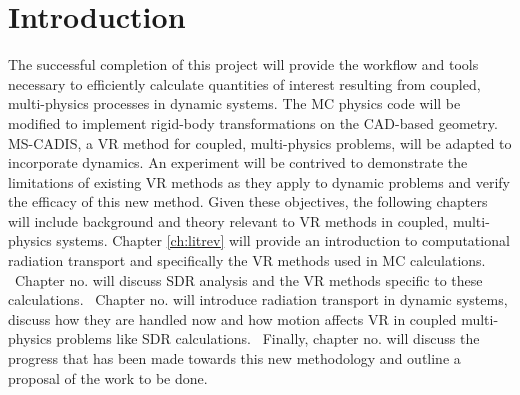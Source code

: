 
\chapter{Introduction} \label{ch:intro}

The successful completion of this project will provide the workflow and tools
necessary to efficiently calculate quantities of interest resulting from
coupled, multi-physics processes in dynamic systems.  The MC physics code will
be modified to implement rigid-body transformations on the CAD-based geometry.
MS-CADIS, a VR method for coupled, multi-physics problems, will be adapted to
incorporate dynamics.  An experiment will be contrived to demonstrate the
limitations of existing VR methods as they apply to dynamic problems and verify
the efficacy of this new method.  Given these objectives, the following chapters
will include background and theory relevant to VR methods in coupled,
multi-physics systems.  Chapter \ref{ch:litrev} will provide an introduction to computational
radiation transport and specifically the VR methods used in MC calculations.
 Chapter no. will discuss SDR analysis and the VR methods specific to these
calculations.  Chapter no. will introduce radiation transport in dynamic systems,
discuss how they are handled now and how motion affects VR in coupled
multi-physics problems like SDR calculations.  Finally, chapter no. will discuss
the progress that has been made towards this new methodology and outline a
proposal of the work to be done.

